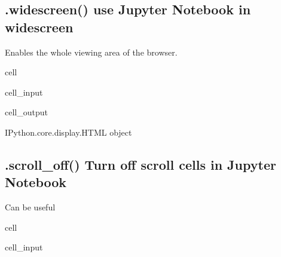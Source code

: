 \documentclass[letterpaper,10pt,english]{jupyterBook}
\begin{document}
\subsection{.widescreen() use Jupyter Notebook in widescreen}
\label{\detokenize{content/Python/modelflow_features:widescreen-use-jupyter-notebook-in-widescreen}}
\sphinxAtStartPar
Enables the whole viewing area of the browser.

\begin{sphinxuseclass}{cell}\begin{sphinxVerbatimInput}

\begin{sphinxuseclass}{cell_input}
\begin{sphinxVerbatim}[commandchars=\\\{\}]
\end{sphinxVerbatim}

\end{sphinxuseclass}\end{sphinxVerbatimInput}
\begin{sphinxVerbatimOutput}

\begin{sphinxuseclass}{cell_output}
\begin{sphinxVerbatim}[commandchars=\\\{\}]
\PYGZlt{}IPython.core.display.HTML object\PYGZgt{}
\end{sphinxVerbatim}

\end{sphinxuseclass}\end{sphinxVerbatimOutput}

\end{sphinxuseclass}

\subsection{.scroll\_off() Turn off scroll cells in Jupyter Notebook}
\label{\detokenize{content/Python/modelflow_features:scroll-off-turn-off-scroll-cells-in-jupyter-notebook}}
\sphinxAtStartPar
Can be useful

\begin{sphinxuseclass}{cell}\begin{sphinxVerbatimInput}

\begin{sphinxuseclass}{cell_input}
\begin{sphinxVerbatim}[commandchars=\\\{\}]
\end{sphinxVerbatim}

\end{sphinxuseclass}\end{sphinxVerbatimInput}

\end{sphinxuseclass}
\end{document}
